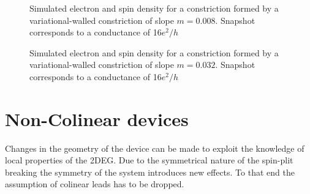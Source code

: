 \begin{figure}[h]
\caption{Simulated electron and spin density for a constriction formed by a variational-walled constriction of slope $m=0.008$. Snapshot corresponds to a conductance of 16$e^2/h$}
\end{figure}
\begin{figure}[h]
\caption{Simulated electron and spin density for a constriction formed by a variational-walled constriction of slope $m=0.032$. Snapshot corresponds to a conductance of 16$e^2/h$ }
\end{figure}
\FloatBarrier
\section{Non-Colinear devices}
Changes in the geometry of the device can be made to exploit the knowledge of local properties of the 2DEG. Due to the symmetrical nature of the spin-plit breaking the symmetry of the system introduces new effects. To that end the assumption of colinear leads has to be dropped.
